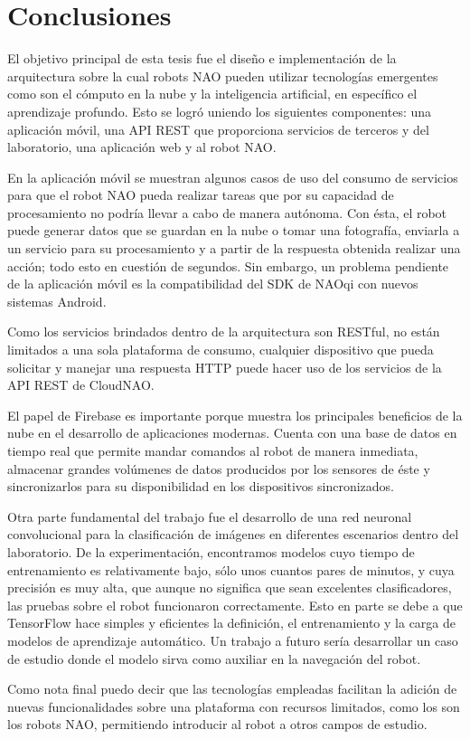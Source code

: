 \chapter*{Conclusiones}
\label{\detokenize{conclusion:cloudnao-una-arquitectura-de-software-para-la-integracion-de-computo-en-la-nube-con-robots-nao}}\label{\detokenize{conclusion:conclusion}}\label{\detokenize{conclusion::doc}}


El objetivo principal de esta tesis fue el diseño e 
implementación de
la arquitectura sobre la cual robots NAO pueden
utilizar tecnologías emergentes como son el cómputo en la nube
y la inteligencia artificial, en específico el aprendizaje 
profundo. Esto se logró uniendo los siguientes componentes:
una aplicación móvil, una API REST que proporciona servicios de terceros y del laboratorio, una aplicación web y
al robot NAO.

En la aplicación
móvil se muestran algunos casos de uso del consumo de
servicios para que el robot NAO pueda realizar tareas
que por su capacidad de procesamiento no podría 
llevar a cabo de manera autónoma.
Con ésta, el robot puede generar datos que
se guardan en la nube o tomar una fotografía,
enviarla a un servicio para su procesamiento y a partir
de la respuesta obtenida realizar una acción; todo
esto en cuestión de segundos.
Sin embargo, un problema pendiente de la aplicación móvil
es la compatibilidad del SDK de NAOqi con nuevos sistemas
Android.

Como los servicios brindados dentro de la arquitectura son 
RESTful, no están limitados a una sola plataforma
de consumo, cualquier dispositivo que pueda solicitar y
manejar una respuesta HTTP puede hacer uso de los servicios
de la API REST de CloudNAO.

El papel de Firebase es importante porque muestra
los principales beneficios de la nube en el desarrollo
de aplicaciones modernas. Cuenta con una base de datos en tiempo
real que permite mandar comandos al robot de manera
inmediata, almacenar grandes volúmenes de datos
producidos por los sensores de éste y sincronizarlos
para su disponibilidad en los dispositivos sincronizados.

Otra parte fundamental del trabajo fue el desarrollo
de una red neuronal convolucional para la clasificación
de imágenes en diferentes escenarios dentro del laboratorio.
De la experimentación, encontramos modelos
cuyo tiempo de entrenamiento es relativamente bajo, sólo unos 
cuantos pares de minutos, y cuya precisión es muy alta, que 
aunque no significa que sean excelentes clasificadores,
las pruebas sobre el robot funcionaron correctamente.
Esto en parte se debe a que
TensorFlow hace simples y eficientes
la definición, el entrenamiento y la carga de modelos de 
aprendizaje automático. 
Un trabajo a futuro sería desarrollar un caso de estudio 
donde el modelo sirva como auxiliar en la navegación
del robot.

Como nota final puedo decir que las tecnologías empleadas
facilitan la adición
de nuevas funcionalidades sobre una plataforma con recursos
limitados, como los son los robots NAO,
permitiendo introducir al robot a otros campos de estudio.
